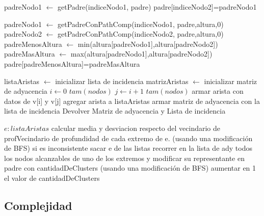 \documentclass[12pt,a4paper]{article}
\begin{document}
\begin{codebox}
\li padreNodo1 $\gets$ getPadre(indiceNodo1, padre)
\li padre[indiceNodo2]=padreNodo1
\end{codebox}

\begin{codebox}
\li padreNodo1 $\gets$ getPadreConPathComp(indiceNodo1, padre,altura,0)
\li padreNodo2 $\gets$ getPadreConPathComp(indiceNodo2, padre,altura,0)
\li padreMenosAltura $\gets$ min(altura[padreNodo1],altura[padreNodo2])
\li padreMasAltura $\gets$ max(altura[padreNodo1],altura[padreNodo2])
\li padre[padreMenosAltura]=padreMasAltura
\end{codebox}


\begin{codebox}
\li listaAristas $\gets$ inicializar lista de incidencia
\li matrizAristas $\gets$ inicializar matriz de adyacencia
\li \For $i \gets 0$ \To $tam(nodos)$
\li 	\For  $j \gets i+1$ \To $tam(nodos)$
			\li armar arista con datos de v[i] y v[j]
			\li agregar arista a listaAristas
		\End
	\End
\li armar matriz de adyacencia con la lista de incidencia
\li Devolver Matriz de adyacencia y Lista de incidencia
\end{codebox}

\begin{codebox}
\li \For $e:listaAristas$
\li calcular media y desviacion respecto del vecindario de profVecindario de profundidad de cada extremo de e. (usando una modificación de BFS)
\li si es inconsistente
\li sacar e de las listas
\li recorrer en la lista de ady todos los nodos alcanzables de uno de los extremos y modificar su representante en padre con cantidadDeClusters (usando una modificación de BFS)
\li aumentar en 1 el valor de cantidadDeClusters

\li \End
\end{codebox}


\subsection{Complejidad}
\end{document}

